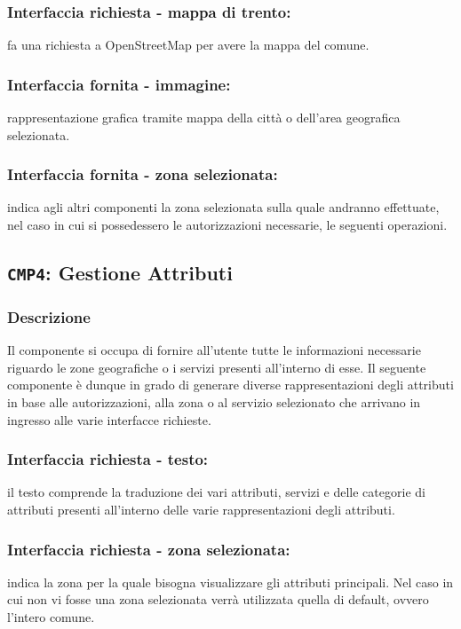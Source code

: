         \subsubsection{Interfaccia richiesta - mappa di trento:}
            fa una richiesta a OpenStreetMap per avere la mappa del comune.
        \subsubsection{Interfaccia fornita - immagine:}
            rappresentazione grafica tramite mappa della città o dell'area geografica selezionata.
        \subsubsection{Interfaccia fornita - zona selezionata:}
            indica agli altri componenti la zona selezionata sulla quale andranno effettuate, nel caso in cui si possedessero le autorizzazioni necessarie, le seguenti operazioni.
    
    \subsection{\texttt{CMP4}: Gestione Attributi}
        \subsubsection{Descrizione}
            Il componente si occupa di fornire all'utente tutte le informazioni necessarie riguardo le zone geografiche o i servizi presenti all'interno di esse. Il seguente componente è dunque in grado di generare diverse rappresentazioni degli attributi in base alle autorizzazioni, alla zona o al servizio selezionato che arrivano in ingresso alle varie interfacce richieste.
        \subsubsection{Interfaccia richiesta - testo:}
            il testo comprende la traduzione dei vari attributi, servizi e delle categorie di attributi presenti all'interno delle varie rappresentazioni degli attributi.
        \subsubsection{Interfaccia richiesta - zona selezionata:}
            indica la zona per la quale bisogna visualizzare gli attributi principali. Nel caso in cui non vi fosse una zona selezionata verrà utilizzata quella di default, ovvero l'intero comune.
